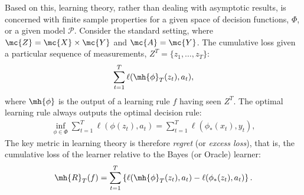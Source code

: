 \documentclass{article}
\begin{document}
Based on this, learning theory, rather than dealing with asymptotic results, is concerned with finite sample properties for a given space of decision functions, $\Phi$, or a given model $\mathcal{P}$. 
Consider the standard setting, where $\mc{Z}=\mc{X} \times \mc{Y}$ and $\mc{A}=\mc{Y}$.
The cumulative loss given a particular sequence of measurements, $Z^T=\{z_1,\ldots, z_T\}$:
\begin{align} \nonumber
    \sum_{t=1}^T \ell(\mh{\phi}_{T}(z_t),a_t),
\end{align}
where $\mh{\phi}$ is the output of a learning rule $f$ having seen $Z^T$.  The optimal learning rule always outputs the optimal decision rule:
\begin{align} \nonumber
    \inf_{\phi \in \Phi} \sum_{t=1}^T \ell(\phi(z_t),a_t) = \sum_{t=1}^T \ell(\phi_*(x_t),y_t),
\end{align}
The key metric in  learning theory is therefore \emph{regret} (or \emph{excess loss}), that is, the cumulative loss of the learner relative to the Bayes (or Oracle) learner:
\begin{align} %
    \mh{R}_T(f) = \sum_{t=1}^T  \left\{ \ell(\mh{\phi}_{T}(z_t),a_t) - \ell(\phi_*(z_t),a_t) \right\}. 
\end{align}

\end{document}
